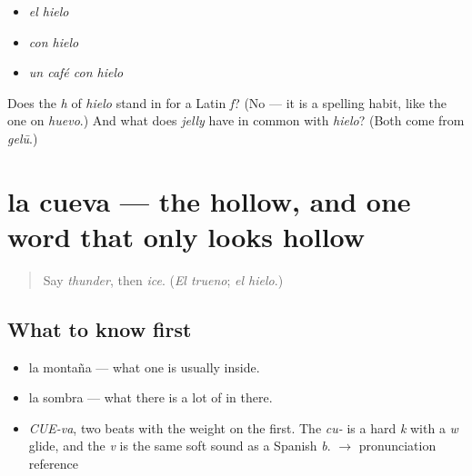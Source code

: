 \begin{itemize}
\raggedright
  \item \emph{el hielo}
  \item \emph{con hielo}
  \item \emph{un café con hielo}
\end{itemize}

\begin{tcolorbox}[breakable,colback=teal!4,colframe=teal!35!black,title={Before you move on}]
Does the \emph{h} of \emph{hielo} stand in for a Latin \emph{f}? (No — it is a spelling habit, like the one on \emph{huevo}.) And what does \emph{jelly} have in common with \emph{hielo}? (Both come from \emph{gelū}.)
\end{tcolorbox}
\section[la cueva]{la cueva — the hollow, and one word that only looks hollow}

\label{lesson:ES-C370-cueva}



\begin{quote}
Say \emph{thunder}, then \emph{ice}. (\emph{El trueno}; \emph{el hielo}.)
\end{quote}

\subsection*{What to know first}
\begin{itemize}
\raggedright
  \item la montaña — what one is usually inside.
  \item la sombra — what there is a lot of in there.
\end{itemize}

\begin{sounds}
\begin{itemize}
\raggedright
  \item \emph{CUE-va}, two beats with the weight on the first. The \emph{cu-} is a hard \emph{k} with a \emph{w} glide, and the \emph{v} is the same soft sound as a Spanish \emph{b}. $\to$ pronunciation reference
\end{itemize}
\end{sounds}

